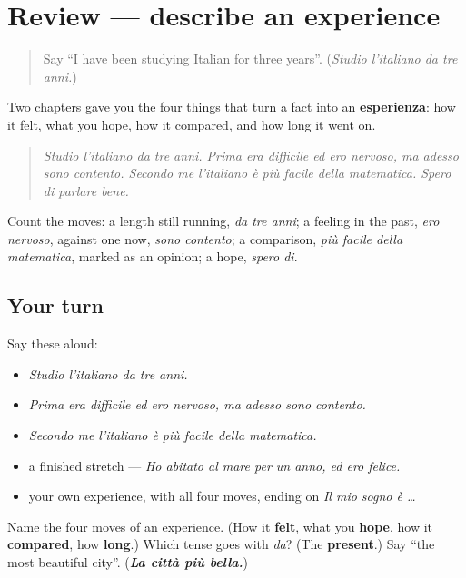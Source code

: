 \section[(review)]{Review — describe an experience}

\label{lesson:IT-C270-ripasso-esperienza}



\begin{quote}
Say \textquotedblleft{}I have been studying Italian for three years\textquotedblright{}. (\emph{Studio l'italiano da tre anni.})
\end{quote}

\begin{grammarlens}[title={What you've built}]
Two chapters gave you the four things that turn a fact into an \textbf{esperienza}: how it felt, what you hope, how it compared, and how long it went on.

\begin{quote}
\emph{Studio l'italiano da tre anni. Prima era difficile ed ero nervoso, ma adesso sono contento. Secondo me l'italiano è più facile della matematica. Spero di parlare bene.}
\end{quote}

Count the moves: a length still running, \emph{da tre anni}; a feeling in the past, \emph{ero nervoso}, against one now, \emph{sono contento}; a comparison, \emph{più facile della matematica}, marked as an opinion; a hope, \emph{spero di}.
\end{grammarlens}

\subsection*{Your turn}
Say these aloud:

\begin{itemize}
\raggedright
  \item \emph{Studio l'italiano da tre anni.}
  \item \emph{Prima era difficile ed ero nervoso, ma adesso sono contento.}
  \item \emph{Secondo me l'italiano è più facile della matematica.}
  \item a finished stretch — \emph{Ho abitato al mare per un anno, ed ero felice.}
  \item your own experience, with all four moves, ending on \emph{Il mio sogno è …}
\end{itemize}

\begin{tcolorbox}[breakable,colback=teal!4,colframe=teal!35!black,title={Before you move on}]
Name the four moves of an experience. (How it \textbf{felt}, what you \textbf{hope}, how it \textbf{compared}, how \textbf{long}.) Which tense goes with \emph{da}? (The \textbf{present}.) Say \textquotedblleft{}the most beautiful city\textquotedblright{}. (\emph{\textbf{La città più bella.}})
\end{tcolorbox}
